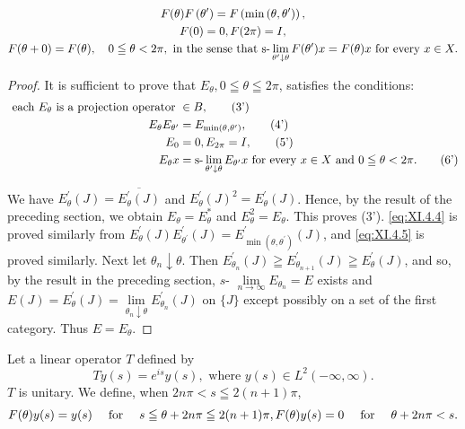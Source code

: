 \begin{gather}F (\theta) F \left(\theta^{\prime}\right) = F \left(\min \left(\theta , \theta^{\prime}\right)\right), \label{eq:XI.4.4} \\F (0) = 0, F (2 \pi) = I, \label{eq:XI.4.5} \\F (\theta + 0) = F (\theta), \quad 0 \leqq \theta < 2 \pi , \text{ in the sense that } \text{s-}\lim _ {\theta^{\prime} \downarrow \theta} F (\theta^{\prime}) x = F (\theta) x \text{ for every } x \in X. \label{eq:XI.4.6}
\end{gather}

\begin{proof}
 It is sufficient to prove that $E_{\theta}, 0 \leqq \theta \leqq 2\pi$, satisfies the conditions: 
\begin{align}
\text{ each } E _{\theta} \text{ is a projection operator }& \in B , \tag{3'}\label{eq:XI.4.3'} \\
E _{\theta} E _ {\theta^{\prime}}& = E _ {\min (\theta , \theta^{\prime})}, \tag{4'}\label{eq:XI.4.4'} \\
E _{0}& = 0, E _{2 \pi} = I, \tag{5'}\label{eq:XI.4.5'} \\
E _{\theta} x& = \text{s-}\lim _ {\theta^{\prime} \downarrow \theta} E _ {\theta^{\prime}} x \text{ for every } x \in X \text{ and } 0 \leqq \theta < 2 \pi .  \tag{6'}\label{eq:XI.4.6'} \end{align}

We have $E_{\theta}^{\prime}(J) = \overline{E_{\theta}^{\prime}(J)}$ and $E_{\theta}^{\prime}(J)^{2} = E_{\theta}^{\prime}(J)$. Hence, by the result of the preceding section, we obtain $E_{\theta} = E_{\theta}^{*}$ and $E_{\theta}^{2} = E_{\theta}$. This proves ($3$'). \eqref{eq:XI.4.4} is proved similarly from $E_{\theta}^{\prime}(J)E_{\theta^{\prime}}^{\prime}(J) = E_{\min (\theta ,\theta^{\prime})}^{\prime}(J)$, and \eqref{eq:XI.4.5} is proved similarly. Next let $\theta_{n}\downarrow \theta$. Then $E_{\theta_n}^{\prime}(J)\geqq E_{\theta_{n+1}}^{\prime}(J)\geqq E_{\theta}^{\prime}(J)$, and so, by the result in the preceding section, $s\text{- }\lim\limits_{n\to \infty}E_{\theta_n} = E$ exists and $E(J) = E_{\theta}^{\prime}(J) = \lim\limits_{\theta_{n}\downarrow \theta}E_{\theta_{n}}^{\prime}(J)$ on $\{J\}$ except possibly on a set of the first category. Thus $E = E_{\theta}$. 
\end{proof}

\begin{example}\label{ex:XI.4.Example.1} Let a linear operator $T$ defined by 
\[
T y (s) = e ^{is} y (s), \text{ where } y (s) \in L ^{2} (- \infty , \infty).
\]
$T$ is unitary. We define, when $2n\pi < s \leqq 2(n + 1)\pi$, 
\begin{equation}F (\theta) y (s) = y (s) \quad \text{ for } \quad s \leqq \theta + 2 n \pi \leqq 2 (n + 1) \pi , F (\theta) y (s) = 0 \quad \text{ for } \quad \theta + 2 n \pi < s. \notag\end{equation}
\end{example}


